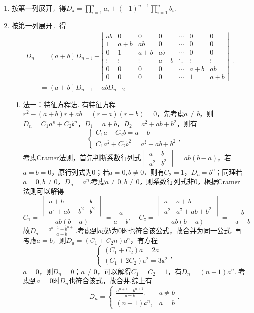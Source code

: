 \begin{enumerate}
    \item 按第一列展开，得$D_n=\prod_{i=1}^na_i+(-1)^{n+1}\prod_{i=1}^nb_i$.

    \item 按第一列展开，得\[\begin{aligned}
    D_{n}&=(a+b) D_{n-1}-\left|\begin{array}{ccccccc}
    a b & 0 & 0 & 0 & \cdots & 0 & 0 \\
    1 & a+b & a b & 0 & \cdots & 0 & 0 \\
    0 & 1 & a+b & a b & \cdots & 0 & 0 \\
    \vdots & \vdots & \vdots & a+b & \ddots & \vdots & \vdots \\
    0 & 0 & 0 & 0 & \cdots & a+b & a b \\
    0 & 0 & 0 & 0 & \cdots & 1 & a+b
    \end{array}\right| \\
    &=(a+b) D_{n-1}-a b D_{n-2}
    \end{aligned}.\]
    \begin{enumerate}
        \item 法一：特征方程法. 有特征方程$r^2-(a+b)r+ab=(r-a)(r-b)=0$，先考虑$a\neq b$，则$D_n=C_1a^n+C_2b^n$，$D_{1}=a+b$，$D_{2}=a^{2}+a b+b^{2}$，则有
        \[\begin{cases}
            C_1a+C_2b=a+b\\
            C_1a^2+C_2b^2=a^2+ab+b^2
            \end{cases},\]
        考虑Cramer法则，首先判断系数行列式$\begin{vmatrix}
            a&b\\
            a^2&b^2
        \end{vmatrix}=ab(b-a)$，若$a=b=0$，原行列式为0；若$a=0,b\neq 0$，则有$C_2=1$，$D_n=b^n$；同理若$a=0,b\neq 0$，$D_n=a^n$.考虑$a\neq 0,b\neq 0$，则系数行列式非0，根据Cramer法则可以解得
        \[C_1=\frac{\begin{vmatrix}
            a+b&b\\
            a^2+ab+b^2&b^2
            \end{vmatrix}}{ab(b-a)}=\frac{a}{a-b},\quad
            C_2=\frac{\begin{vmatrix}
            a&a+b\\
            a^2&a^2+ab+b^2
            \end{vmatrix}}{ab(b-a)}=-\frac{b}{a-b}\]
        故$D_n=\displaystyle\frac{a^{n+1}-b^{n+1}}{a-b}$.考虑到$a$或$b$为0时也符合该公式，故合并为同一公式. 再考虑$a=b$，则$D_n=(C_1+C_2n)a^n$，有方程
        \[\begin{cases}
            (C_1+C_2)a=2a\\
            (C_1+2C_2)a^2=3a^2
            \end{cases},\]
        $a=0$，则$D_n=0$；$a\neq 0$，可以解得$C_1=C_2=1$，有$D_n=(n+1)a^n$. 考虑到$a=0$时$D_n$也符合该式，故合并.综上有
        \[D_n=\begin{cases}
            \displaystyle\frac{a^{n+1}-b^{n+1}}{a-b},&a\neq b\\
            (n+1)a^n,&a=b
            \end{cases}.\]


\end{enumerate}
\end{enumerate}
